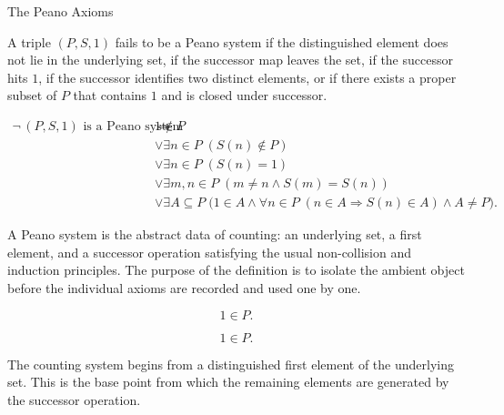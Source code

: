 \begin{topicbox}{The Peano Axioms}
\begin{remark*}
A triple $(P,S,1)$ fails to be a Peano system if the distinguished element
does not lie in the underlying set, if the successor map leaves the set, if
the successor hits $1$, if the successor identifies two distinct elements, or
if there exists a proper subset of $P$ that contains $1$ and is closed under
successor.
\end{remark*}

\begin{remark*}
\[
\begin{aligned}
\neg\,\text{$(P,S,1)$ is a Peano system}
\Longrightarrow\;&
1 \notin P \\
&\lor \exists n \in P\;(S(n) \notin P) \\
&\lor \exists n \in P\;(S(n)=1) \\
&\lor \exists m,n \in P\;(m \neq n \land S(m)=S(n)) \\
&\lor \exists A \subseteq P\;
\bigl(1 \in A \land
\forall n \in P\;(n \in A \Longrightarrow S(n) \in A)
\land A \neq P\bigr).
\end{aligned}
\]
\end{remark*}

\begin{remark*}[Interpretation]
A Peano system is the abstract data of counting: an underlying set, a first
element, and a successor operation satisfying the usual non-collision and
induction principles. The purpose of the definition is to isolate the ambient
object before the individual axioms are recorded and used one by one.
\end{remark*}

\NoLocalDependencies

\begin{tcolorbox}[colback=axiombox, colframe=axiomborder, arc=2pt,
  left=6pt, right=6pt, top=4pt, bottom=4pt,
  title={\small\textbf{Axiom (One Is a Natural Number)}},
  fonttitle=\small\bfseries]
\begin{axiom}
\label{ax:peano-one-in-n}
\[
1 \in P.
\]
\end{axiom}
\end{tcolorbox}

\begin{remark*}
\[
1 \in P.
\]
\end{remark*}

\begin{remark*}[Interpretation]
The counting system begins from a distinguished first element of the
underlying set. This is the base point from which the remaining elements are
generated by the successor operation.
\end{remark*}


\end{topicbox}
